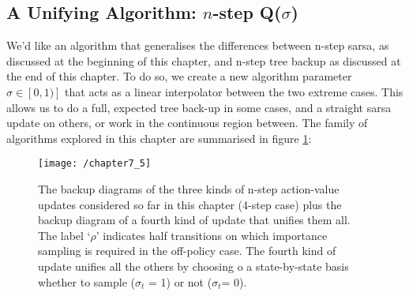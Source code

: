 \subsection{A Unifying Algorithm: $n$-step Q($\sigma$)}
We'd like an algorithm that generalises the differences between n-step sarsa, as discussed at the beginning of this chapter, and n-step tree backup as discussed at the end of this chapter. To do so, we create a new algorithm parameter $\sigma \in [0,1)]$ that acts as a linear interpolator between the two extreme cases. This allows us to do a full, expected tree back-up in some cases, and a straight sarsa update on others, or work in the continuous region between. The family of algorithms explored in this chapter are summarised in figure \ref{fig: all chap 7 backup diagrams}:

\begin{figure}
	\centering
	\texttt{[image: /chapter7\_5]}
	\caption{The backup diagrams of the three kinds of n-step action-value updates considered so far in this chapter (4-step case) plus the backup diagram of a fourth kind of update that unifies them all. The label ‘$\rho$’ indicates half transitions on which importance sampling is required in the off-policy case. The fourth kind of update unifies all the others by choosing o a state-by-state basis whether to sample ($\sigma_t$ = 1) or not ($\sigma_t$= 0).}
	\label{fig: all chap 7 backup diagrams}
\end{figure}

